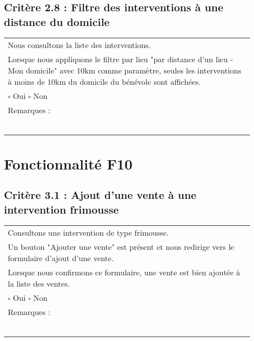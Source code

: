   	\subsection*{Critère 2.8 : Filtre des interventions à une distance du domicile}
  		\begin{center}
    	 		\begin{tabular}[h]{|p{}|}
			\hline
				Nous consultons la liste des interventions. \\
				Lorsque nous appliquons le filtre par lieu "par distance d'un lieu - Mon domicile" avec 10km comme paramètre, seules les interventions à moins de 10km du domicile du bénévole sont affichées. \\
						
				$\square$ Oui  \hfill \hfill $\square$ Non \\\hline Remarques : \\ ~\\
			 \\\hline
     		\end{tabular}
  		\end{center}	
  		
  		
\section{Fonctionnalité F10}
\subsection*{Critère 3.1 : Ajout d'une vente à une intervention frimousse }
  		\begin{center}
    	 		\begin{tabular}[h]{|p{}|}
			\hline
				Consultons une intervention de type frimousse. \\
				Un bouton "Ajouter une vente" est présent et nous redirige vers le formulaire d'ajout d'une vente. \\
				Lorsque nous confirmons ce formulaire, une vente est bien ajoutée à la liste des ventes. \\
				
				$\square$ Oui  \hfill \hfill $\square$ Non \\\hline Remarques : \\ ~\\
			 \\\hline
     		\end{tabular}
  		\end{center}	
  		
